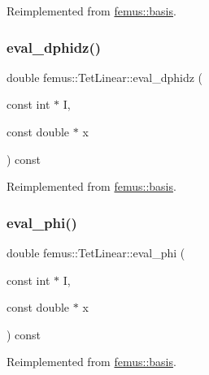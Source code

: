 Reimplemented from \mbox{\hyperlink{classfemus_1_1basis_a2819fac9aae797156b9efec8a0b85cc1}{femus\+::basis}}.

\mbox{\label{classfemus_1_1_tet_linear_ae399d6e283b007349b0170579954e3fc}} 
\subsubsection{\texorpdfstring{eval\+\_\+dphidz()}{eval\_dphidz()}}
{\footnotesize\ttfamily double femus\+::\+Tet\+Linear\+::eval\+\_\+dphidz (\begin{DoxyParamCaption}\item[{const int $\ast$}]{I,  }\item[{const double $\ast$}]{x }\end{DoxyParamCaption}) const\hspace{0.3cm}{\ttfamily [virtual]}}



Reimplemented from \mbox{\hyperlink{classfemus_1_1basis_affd9927f6e25e264108219d862b8cb3d}{femus\+::basis}}.

\mbox{\label{classfemus_1_1_tet_linear_a99764a6a2e65bc163dc17c864db6c55d}} 
\subsubsection{\texorpdfstring{eval\+\_\+phi()}{eval\_phi()}}
{\footnotesize\ttfamily double femus\+::\+Tet\+Linear\+::eval\+\_\+phi (\begin{DoxyParamCaption}\item[{const int $\ast$}]{I,  }\item[{const double $\ast$}]{x }\end{DoxyParamCaption}) const\hspace{0.3cm}{\ttfamily [virtual]}}



Reimplemented from \mbox{\hyperlink{classfemus_1_1basis_a89b0797cdccffae5ff6d059b32016ae5}{femus\+::basis}}.

\mbox{\label{classfemus_1_1_tet_linear_a3c42a3845b94a0b0d0fd654f6cbee9d2}} 
